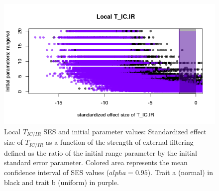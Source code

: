 \documentclass[12pt]{article}\usepackage[]{graphicx}\usepackage[]{color}
\makeatletter
\def\maxwidth{ %
  \ifdim\Gin@nat@width>\linewidth
    \linewidth
  \else
    \Gin@nat@width
  \fi
}
\newenvironment{knitrout}{}{} %
\makeatother
\begin{document}
\begin{knitrout}
\begin{figure}
{\centering \includegraphics[width=\maxwidth]{figure/Ex_filter_results_plot_initparam1-1} 

}

\caption[Local $T_{IC/IR}$ SES and initial parameter values]{Local $T_{IC/IR}$ SES and initial parameter values: Standardized effect size of $T_{IC/IR}$ as a function of the strength of external filtering defined as the ratio of the initial range parameter by the initial standard error parameter. Colored area represents the mean confidence interval of SES values ($alpha = 0.95$). Trait a (normal) in black and trait b (uniform) in purple.}\label{fig:Ex_filter_results_plot_initparam1}
\end{figure}


\end{knitrout}
 
\end{document}
